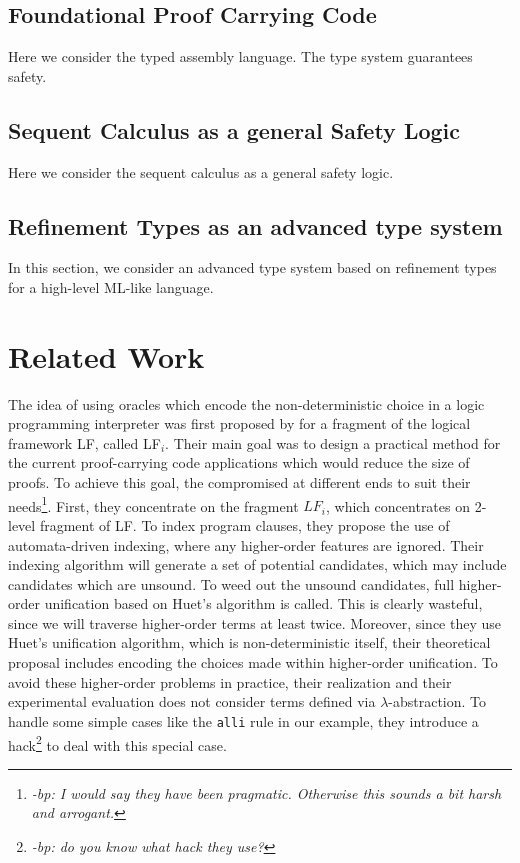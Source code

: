 \documentclass{acmconf}
\newcommand{\ednote}[1]{\footnote{\it #1}}
\begin{document}
\subsection{Foundational Proof Carrying Code}
Here we consider the typed assembly language. The type system
guarantees safety.

\subsection{Sequent Calculus as a general Safety Logic}
Here we consider the sequent calculus as a general safety logic.

\subsection{Refinement Types as an advanced type system}
In this section, we consider an advanced type system based on
refinement types for a high-level ML-like language. 


\section{Related Work}
The idea of using oracles which encode the non-deterministic choice in
a logic programming interpreter was first proposed by
\cite{Necula+01:oracle} for a fragment of the logical framework LF,
called LF$_i$. Their main goal was to design a practical method for
the current proof-carrying code applications which would reduce the
size of proofs. To achieve this goal, the compromised at different
ends to suit their needs\ednote{-bp: I would say they have been
  pragmatic. Otherwise this sounds a bit harsh and arrogant. }. First,
they concentrate on the fragment $LF_i$, which concentrates on 2-level fragment of
LF. To index program clauses, they propose the use of automata-driven
indexing, where any higher-order features are ignored. Their
indexing algorithm will generate a set of potential candidates, which
may include candidates which are unsound. To weed out the unsound
candidates, full higher-order unification based on Huet's algorithm is
called. This is clearly wasteful, since we will traverse higher-order
terms at least twice. Moreover, since they use Huet's unification
algorithm, which is non-deterministic itself, their theoretical
proposal includes encoding the choices made within higher-order
unification. To avoid these higher-order problems in practice, their
realization and their experimental evaluation does not consider 
terms defined via $\lambda$-abstraction. To handle some simple cases
like the {\tt alli} rule in our example, they introduce a
hack\ednote{-bp: do you know what hack they use?} to deal
with this special case. 
\end{document}
